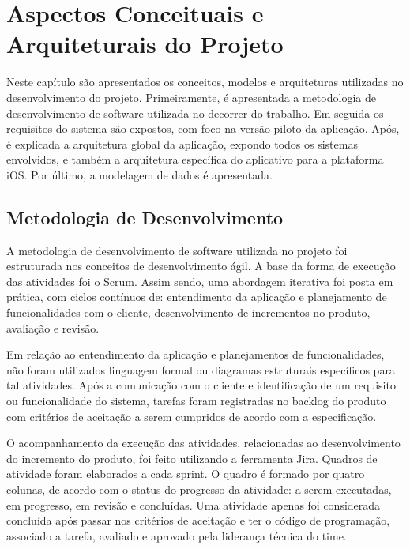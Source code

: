 \chapter{Aspectos Conceituais e Arquiteturais do Projeto} \label{cap:architecture}
Neste capítulo são apresentados os conceitos, modelos e arquiteturas utilizadas no desenvolvimento do projeto. Primeiramente, é apresentada a metodologia de desenvolvimento de software utilizada no decorrer do trabalho. Em seguida os requisitos do sistema são expostos, com foco na versão piloto da aplicação. Após, é explicada a arquitetura global da aplicação, expondo todos os sistemas envolvidos, e também a arquitetura específica do aplicativo para a plataforma iOS. Por último, a modelagem de dados é apresentada.

\section{Metodologia de Desenvolvimento}
A metodologia de desenvolvimento de software utilizada no projeto foi estruturada nos conceitos de desenvolvimento ágil. A base da forma de execução das atividades foi o Scrum. Assim sendo, uma abordagem iterativa foi posta em prática, com ciclos contínuos de: entendimento da aplicação e planejamento de funcionalidades com o cliente, desenvolvimento de incrementos no produto, avaliação e revisão.

Em relação ao entendimento da aplicação e planejamentos de funcionalidades, não foram utilizados linguagem formal ou diagramas estruturais específicos para tal atividades. Após a comunicação com o cliente e identificação de um requisito ou funcionalidade do sistema, tarefas foram registradas no backlog do produto com critérios de aceitação a serem cumpridos de acordo com a especificação.

O acompanhamento da execução das atividades, relacionadas ao desenvolvimento do incremento do produto, foi feito utilizando a ferramenta Jira. Quadros de atividade  foram elaborados a cada sprint. O quadro é formado por quatro colunas, de acordo com o status do progresso da atividade: a serem executadas, em progresso, em revisão e concluídas. Uma atividade apenas foi considerada concluída após passar nos critérios de aceitação e ter o código de programação, associado a tarefa, avaliado e aprovado pela liderança técnica do time.


